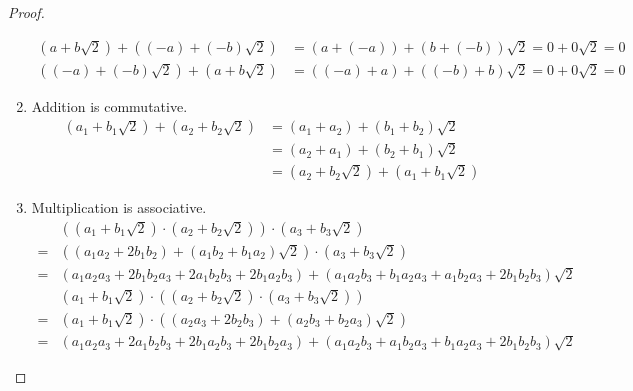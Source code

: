 \begin{proof}
\begin{enumerate}[label = (\arabic*)]
\begin{align*}
                  (a + b\sqrt{2}) + ((-a) + (-b)\sqrt{2}) & = (a + (-a)) + (b + (-b))\sqrt{2} = 0 + 0\sqrt{2} = 0 \\
                  ((-a) + (-b)\sqrt{2}) + (a + b\sqrt{2}) & = ((-a) + a) + ((-b) + b)\sqrt{2} = 0 + 0\sqrt{2} = 0
              \end{align*}
        \item Addition is commutative.
              \begin{align*}
                  (a_{1} + b_{1}\sqrt{2}) + (a_{2} + b_{2}\sqrt{2}) & = (a_{1} + a_{2}) + (b_{1} + b_{2})\sqrt{2}         \\
                                                                    & = (a_{2} + a_{1}) + (b_{2} + b_{1})\sqrt{2}         \\
                                                                    & = (a_{2} + b_{2}\sqrt{2}) + (a_{1} + b_{1}\sqrt{2})
              \end{align*}
        \item Multiplication is associative.
              \begin{align*}
                    & \left((a_{1} + b_{1}\sqrt{2})\cdot (a_{2} + b_{2}\sqrt{2})\right)\cdot (a_{3} + b_{3}\sqrt{2})                                                                \\
                  = & \left((a_{1}a_{2} + 2b_{1}b_{2}) + (a_{1}b_{2} + b_{1}a_{2})\sqrt{2}\right)\cdot(a_{3} + b_{3}\sqrt{2})                                                       \\
                  = & (a_{1}a_{2}a_{3} + 2b_{1}b_{2}a_{3} + 2a_{1}b_{2}b_{3} + 2b_{1}a_{2}b_{3}) + (a_{1}a_{2}b_{3} + b_{1}a_{2}a_{3} + a_{1}b_{2}a_{3} + 2b_{1}b_{2}b_{3})\sqrt{2}
              \end{align*}
              \begin{align*}
                    & (a_{1} + b_{1}\sqrt{2})\cdot\left((a_{2} + b_{2}\sqrt{2})\cdot(a_{3} + b_{3}\sqrt{2})\right)                                                                  \\
                  = & (a_{1} + b_{1}\sqrt{2})\cdot\left( (a_{2}a_{3} + 2b_{2}b_{3}) + (a_{2}b_{3} + b_{2}a_{3})\sqrt{2} \right)                                                     \\
                  = & (a_{1}a_{2}a_{3} + 2a_{1}b_{2}b_{3} + 2b_{1}a_{2}b_{3} + 2b_{1}b_{2}a_{3}) + (a_{1}a_{2}b_{3} + a_{1}b_{2}a_{3} + b_{1}a_{2}a_{3} + 2b_{1}b_{2}b_{3})\sqrt{2}
              \end{align*}

\end{enumerate}
\end{proof}
